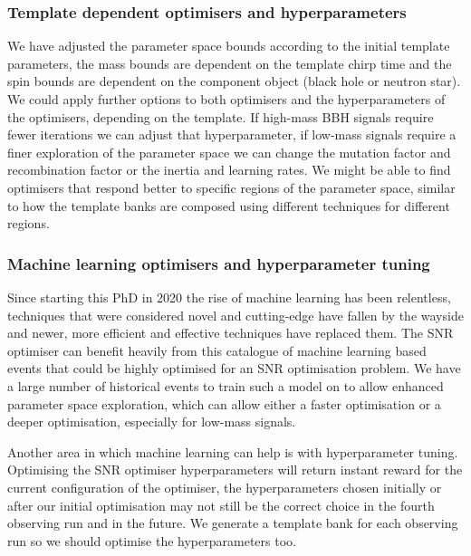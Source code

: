 \subsubsection{Template dependent optimisers and hyperparameters}

We have adjusted the parameter space bounds according to the initial template parameters, the mass bounds are dependent on the template chirp time and the spin bounds are dependent on the component object (black hole or neutron star). We could apply further options to both optimisers and the hyperparameters of the optimisers, depending on the template. If high-mass BBH signals require fewer iterations we can adjust that hyperparameter, if low-mass signals require a finer exploration of the parameter space we can change the mutation factor and recombination factor or the inertia and learning rates. We might be able to find optimisers that respond better to specific regions of the parameter space, similar to how the template banks are composed using different techniques for different regions.

\subsubsection{Machine learning optimisers and hyperparameter tuning}

Since starting this PhD in 2020 the rise of machine learning has been relentless, techniques that were considered novel and cutting-edge have fallen by the wayside and newer, more efficient and effective techniques have replaced them. The SNR optimiser can benefit heavily from this catalogue of machine learning based events that could be highly optimised for an SNR optimisation problem. We have a large number of historical events to train such a model on to allow enhanced parameter space exploration, which can allow either a faster optimisation or a deeper optimisation, especially for low-mass signals.

Another area in which machine learning can help is with hyperparameter tuning. Optimising the SNR optimiser hyperparameters will return instant reward for the current configuration of the optimiser, the hyperparameters chosen initially or after our initial optimisation may not still be the correct choice in the fourth observing run and in the future. We generate a template bank for each observing run so we should optimise the hyperparameters too.
